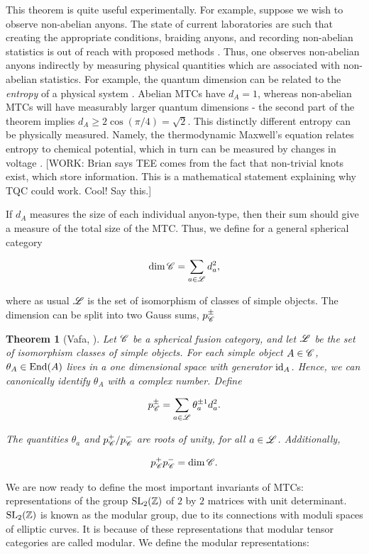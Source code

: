 \documentclass{article}
\newtheorem{theorem}{Theorem}[section]
\theoremstyle{definition}
\numberwithin{figure}{section}
\begin{document}
This theorem is quite useful experimentally. For example, suppose we wish to observe non-abelian anyons. The state of current laboratories are such that creating the appropriate conditions, braiding anyons, and recording non-abelian statistics is out of reach with proposed methods \cite{bonderson2006probing}. Thus, one observes non-abelian anyons indirectly by measuring physical quantities which are associated with non-abelian statistics. For example, the quantum dimension can be related to the \textit{entropy} of a physical system \cite{kitaev2006topological}. Abelian MTCs have $d_A=1$, whereas non-abelian MTCs will have measurably larger quantum dimensions - the second part of the theorem implies $d_A\geq 2\cos(\pi/4)=\sqrt{2}$. This distinctly different entropy can be physically measured. Namely, the thermodynamic Maxwell's equation relates entropy to chemical potential, which in turn can be measured by changes in voltage \cite{cooper2009observable}. [WORK: Brian says TEE comes from the fact that non-trivial knots exist, which store information. This is a mathematical statement explaining why TQC could work. Cool! Say this.]

If $d_A$ measures the size of each individual anyon-type, then their sum should give a measure of the total size of the MTC. Thus, we define for a general spherical category

$$\dim \mathscr{C} = \sum_{a\in \mathscr{L}} d_a^2,$$

where as usual $\mathscr{L}$ is the set of isomorphism of classes of simple objects. The dimension can be split into two Gauss sums, $p^{\pm}_{\mathscr{C}}$

\begin{theorem}[Vafa, \cite{vafa1988toward}] Let $\mathscr{C}$ be a spherical fusion category, and let $\mathscr{L}$ be the set of isomorphism classes of simple objects. For each simple object $A\in \mathscr{C}$, $\theta_A\in \mathrm{End}(A)$ lives in a one dimensional space with generator $\mathrm{id}_A$. Hence, we can canonically identify $\theta_A$ with a complex number. Define

$$p^{\pm}_{\mathscr{C}}=\sum_{a\in \mathscr{L}}\theta_a^{\pm 1}d_a^2.$$

The quantities $\theta_a$ and $p^{+}_{\mathscr{C}}/p^{-}_{\mathscr{C}}$ are roots of unity, for all $a\in \mathscr{L}$. Additionally,

$$p^{+}_{\mathscr{C}}p^{-}_{\mathscr{C}}=\dim \mathscr{C}.$$
\end{theorem}

We are now ready to define the most important invariants of MTCs: representations of the group $\mathrm{SL}_2(\mathbb{Z})$ of $2$ by $2$ matrices with unit determinant. $\mathrm{SL}_2(\mathbb{Z})$ is known as the modular group, due to its connections with moduli spaces of elliptic curves. It is because of these representations that modular tensor categories are called modular. We define the modular representations:
\end{document}
